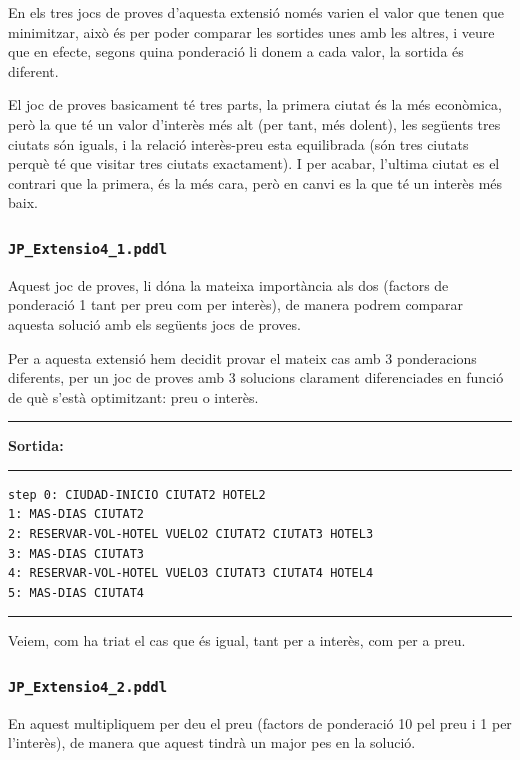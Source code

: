 \documentclass[11pt,a4paper]{article}
\begin{document}
En els tres jocs de proves d'aquesta extensió només varien el valor que tenen que minimitzar, això és per poder comparar les sortides unes amb les altres, i veure que en efecte, segons quina ponderació li donem a cada valor, la sortida és diferent. 

El joc de proves basicament té tres parts, la primera ciutat és la més econòmica, però la que té un valor d'interès més alt (per tant, més dolent), les següents tres ciutats són iguals, i la relació interès-preu esta equilibrada (són tres ciutats perquè té que visitar tres ciutats exactament). I per acabar, l'ultima ciutat es el contrari que la primera, és la més cara, però en canvi es la que té un interès més baix.

\subsubsection*{\texttt{JP\_Extensio4\_1.pddl}}

Aquest joc de proves, li dóna la mateixa importància als dos (factors de ponderació 1 tant per preu com per interès), de manera podrem comparar aquesta solució amb els següents jocs de proves.

Per a aquesta extensió hem decidit provar el mateix cas amb 3 ponderacions diferents, per un joc de proves amb 3 solucions clarament diferenciades en funció de què s'està optimitzant: preu  o interès.

\begin{samepage}
\medskip
\noindent
\rule{0.1\textwidth}{0.5mm}
\textbf{Sortida:}
\rule{0.76\textwidth}{0.5mm}
\begin{verbatim}
step 0: CIUDAD-INICIO CIUTAT2 HOTEL2
1: MAS-DIAS CIUTAT2
2: RESERVAR-VOL-HOTEL VUELO2 CIUTAT2 CIUTAT3 HOTEL3
3: MAS-DIAS CIUTAT3
4: RESERVAR-VOL-HOTEL VUELO3 CIUTAT3 CIUTAT4 HOTEL4
5: MAS-DIAS CIUTAT4
\end{verbatim}
\rule{\textwidth}{0.5mm}
\medskip
\end{samepage}

Veiem, com ha triat el cas que és igual, tant per a interès, com per a preu.

\subsubsection*{\texttt{JP\_Extensio4\_2.pddl}}

En aquest multipliquem per deu el preu (factors de ponderació 10 pel preu i 1 per l'interès), de manera que aquest tindrà un major pes en la solució.
\end{document}
